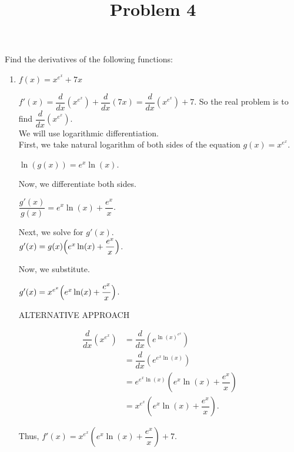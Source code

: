 \documentclass{ximera}
\title[Problem 4]{Problem 4}
\begin{document}
\begin{abstract} \end{abstract}
\maketitle


\begin{problem}
Find the derivatives of the following functions:
	\begin{enumerate}
	
	\item  $f(x) = x^{e^x} + 7x$
\begin{explanation}
		$f'(x) = \dfrac{d}{dx} \left(x^{e^x} \right) + \dfrac{d}{dx}(7x) = \dfrac{d}{dx} \left(x^{e^x} \right) + 7$.  So the real problem is to find $\dfrac{d}{dx} \left(x^{e^x} \right)$.\\
		 
		 We will use logarithmic differentiation. \\
		 
		First, we take natural logarithm of both sides of the equation $g(x)=x^{e^x}$.
		 
		 $\ln{(g(x))}=e^{x}\ln(x)$.
		 
		 Now, we differentiate both sides.
		 
		  $\dfrac{g'(x)}{g(x)}=e^x\ln(x)+\dfrac{e^{x}}{x}$.
		  
		  Next, we solve for $g'(x)$.\\
		  
		    $g'(x)=g(x)\Bigl(e^x\ln(x)+\dfrac{e^{x}}{x}\Bigr)$.
		    
		    Now, we substitute.
		    
		     $g'(x)=x^{e^x}\Bigl(e^x\ln(x)+\dfrac{e^{x}}{x}\Bigr)$.

		  
		ALTERNATIVE APPROACH
		
		\begin{align*}
		\dfrac{d}{dx} \left( x^{e^x} \right) &= \dfrac{d}{dx} \left( e^{\ln(x)^{e^x}} \right) \\
		&= \dfrac{d}{dx} \left( e^{e^x \ln(x)} \right) \\
		&= e^{e^x \ln(x)} \left( e^x \ln(x) + \dfrac{e^x}{x} \right) \\
		&= x^{e^x} \left( e^x \ln(x) + \dfrac{e^x}{x} \right).
		\end{align*}
		
		Thus, $f'(x) = x^{e^x} \left( e^x \ln(x) + \dfrac{e^x}{x} \right) + 7$.  
		

\end{explanation}
\end{enumerate}
\end{problem}
\end{document}
